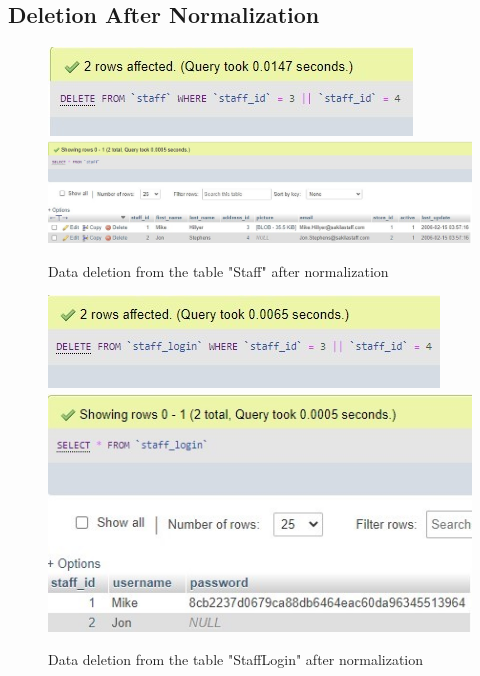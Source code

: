 \documentclass{article}
\begin{document}
	\subsection{Deletion After Normalization}
		\begin{figure}[H]
			\includegraphics[width=\textwidth]{staff1_delete_norm}
			\includegraphics[width=\textwidth]{staff2_delete_norm}
			\caption{Data deletion from the table "Staff" after normalization}
		\end{figure}
		\begin{figure}[H]
			\includegraphics[width=\textwidth]{stafflogin1_delete_norm}
			\includegraphics[width=\textwidth]{stafflogin2_delete_norm}
			\caption{Data deletion from the table "Staff\textunderscore Login" after normalization}
		\end{figure}
\end{document}

